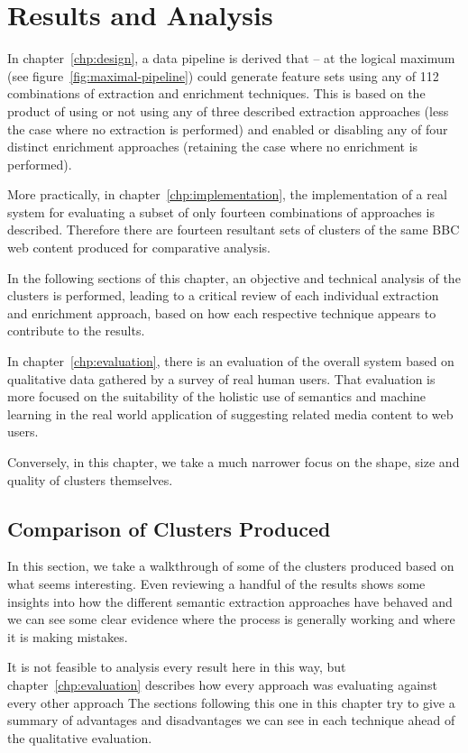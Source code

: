 \chapter{Results and Analysis}

In chapter~\ref{chp:design}, a data pipeline is derived that -- at
the logical maximum (see figure~\ref{fig:maximal-pipeline}) could
generate feature sets using any of 112 combinations of extraction
and enrichment techniques. This is based on the product of using or
not using any of three described extraction approaches (less the case
where no extraction is performed) and enabled or disabling any of
four distinct enrichment approaches (retaining the case where no
enrichment is performed).

More practically, in chapter~\ref{chp:implementation}, the
implementation of a real system for evaluating a subset of only
fourteen combinations of approaches is described. Therefore there
are fourteen resultant sets of clusters of the same BBC web content
produced for comparative analysis.

In the following sections of this chapter, an objective and technical
analysis of the clusters is performed, leading to a critical review
of each individual extraction and enrichment approach, based on how
each respective technique appears to contribute to the results.

In chapter~\ref{chp:evaluation}, there is an evaluation of the
overall system based
on qualitative data gathered by a survey of real human users. That
evaluation is more focused on the suitability of the holistic use of
semantics and machine learning in the real world application of
suggesting related media content to web users.

Conversely, in this chapter, we take a much narrower focus on the
shape, size and quality of clusters themselves.

\section{Comparison of Clusters Produced}
\label{sec:anal-comparison}

In this section, we take a walkthrough of some of the clusters
produced based on what seems interesting. Even reviewing a handful
of the results shows some insights into how the different semantic
extraction approaches have behaved and we can see some clear
evidence where the process is generally working and where it is
making mistakes.

It is not feasible to analysis every result here in this way, but
chapter~\ref{chp:evaluation} describes how every approach was
evaluating against every other approach The sections following
this one in this chapter try to give a summary of advantages and
disadvantages we can see in each technique ahead of the
qualitative evaluation.

